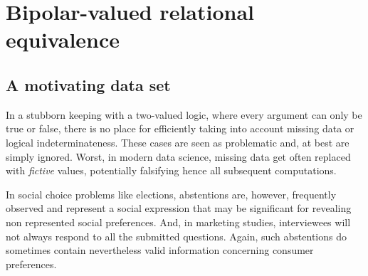\chapter{Bipolar-valued relational equivalence}
\label{sec:16}



\section{A motivating data set}
\label{sec:16.1}

In a stubborn keeping with a two-valued logic, where every argument can only be true or false, there is no place for efficiently taking into account missing data or logical indeterminateness. These cases are seen as problematic and, at best are simply ignored. Worst, in modern data science, missing data get often replaced with \emph{fictive} values, potentially falsifying hence all subsequent computations.

In social choice problems like elections, abstentions are, however, frequently observed and represent a social expression that may be significant for revealing non represented social preferences. And, in marketing studies, interviewees will not always respond to all the submitted questions. Again, such abstentions do sometimes contain nevertheless valid information concerning consumer preferences.

